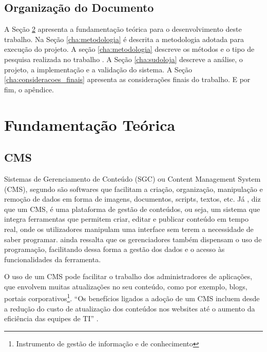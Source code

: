 \documentclass[a4paper,12pt]{monografia}
\begin{document}

\section{Organização do Documento} %
\label{sec:organizacao_do_documento}

A Seção \ref{cha:fundamentaco_teorica} apresenta a fundamentação teórica para o desenvolvimento deste trabalho. Na Seção \ref{cha:metodologia} é descrita a metodologia adotada para execução do projeto. A seção \ref{cha:metodologia} descreve os métodos e o tipo de pesquisa realizada no trabalho . A Seção \ref{cha:sudoloja} descreve a análise, o projeto, a implementação e a validação do sistema. A Seção \ref{cha:consideracoes_finais} apresenta as considerações finais do trabalho. E por fim, o apêndice.

\chapter{Fundamentação Teórica} %
\label{cha:fundamentaco_teorica}

\section{CMS} %
\label{sec:cms}

Sistemas de Gerenciamento de Conteúdo (SGC) ou Content Management System (CMS), segundo  são softwares que facilitam a criação, organização, manipulação e remoção de dados em forma de imagens, documentos, scripts, textos, etc.
Já , diz que um CMS, é uma plataforma de gestão de conteúdos, ou seja, um sistema que integra ferramentas que permitem criar, editar e publicar conteúdo em tempo real, onde os utilizadores manipulam uma interface sem terem a necessidade de saber programar.  ainda ressalta que os gerenciadores também dispensam o uso de programação, facilitando dessa forma a gestão dos dados e o acesso às funcionalidades da ferramenta.

O uso de um CMS pode facilitar o trabalho dos administradores de aplicações, que envolvem muitas atualizações no seu conteúdo, como por exemplo, blogs, portais corporativos\footnote{Instrumento de gestão de informação e de conhecimento}. ``Os benefícios ligados a adoção de um CMS incluem desde a redução do custo de atualização dos conteúdos nos websites até o aumento da eficiência das equipes de TI'' \cite{pereira}.
\end{document}
